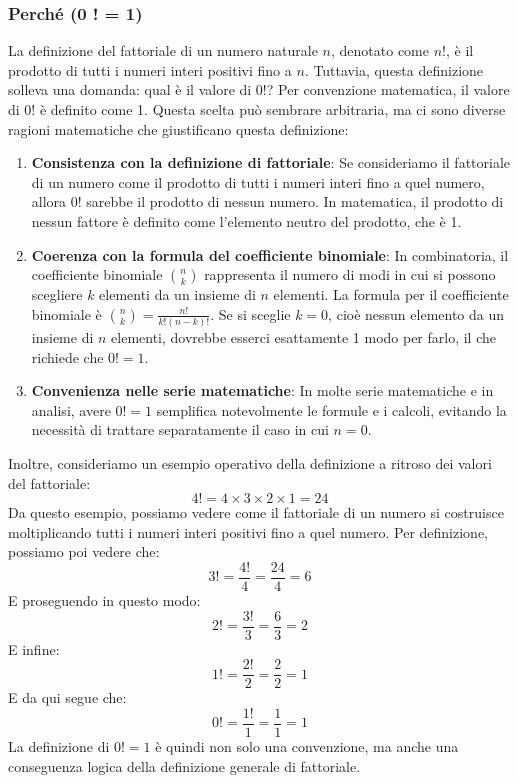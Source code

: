 \documentclass{book}
\begin{document}
\noindent\begin{minipage}{\textwidth}
    \begin{curiosity}
        \subsubsection{Perché (0 ! = 1)}
        La definizione del fattoriale di un numero naturale \( n \), denotato come \( n! \), è il prodotto di tutti i numeri interi positivi fino a \( n \). Tuttavia, questa definizione solleva una domanda: qual è il valore di \( 0! \)?
        Per convenzione matematica, il valore di \( 0! \) è definito come 1. Questa scelta può sembrare arbitraria, ma ci sono diverse ragioni matematiche che giustificano questa definizione:
        \begin{enumerate}
            \item \textbf{Consistenza con la definizione di fattoriale}: Se consideriamo il fattoriale di un numero come il prodotto di tutti i numeri interi fino a quel numero, allora \( 0! \) sarebbe il prodotto di nessun numero. In matematica, il prodotto di nessun fattore è definito come l'elemento neutro del prodotto, che è 1.
            \item \textbf{Coerenza con la formula del coefficiente binomiale}: In combinatoria, il coefficiente binomiale \( \binom{n}{k} \) rappresenta il numero di modi in cui si possono scegliere \( k \) elementi da un insieme di \( n \) elementi. La formula per il coefficiente binomiale è \( \binom{n}{k} = \frac{n!}{k!(n-k)!} \). Se si sceglie \( k = 0 \), cioè nessun elemento da un insieme di \( n \) elementi, dovrebbe esserci esattamente 1 modo per farlo, il che richiede che \( 0! = 1 \).
            \item \textbf{Convenienza nelle serie matematiche}: In molte serie matematiche e in analisi, avere \( 0! = 1 \) semplifica notevolmente le formule e i calcoli, evitando la necessità di trattare separatamente il caso in cui \( n = 0 \).
        \end{enumerate}
        Inoltre, consideriamo un esempio operativo della definizione a ritroso dei valori del fattoriale:
        \[4! = 4 \times 3 \times 2 \times 1 = 24\]
        Da questo esempio, possiamo vedere come il fattoriale di un numero si costruisce moltiplicando tutti i numeri interi positivi fino a quel numero. Per definizione, possiamo poi vedere che:
        \[3! = \frac{4!}{4} = \frac{24}{4} = 6\]
        E proseguendo in questo modo:
        \[2! = \frac{3!}{3} = \frac{6}{3} = 2\]
        E infine:
        \[1! = \frac{2!}{2} = \frac{2}{2} = 1\]
        E da qui segue che:
        \[0! = \frac{1!}{1} = \frac{1}{1} = 1\]
        La definizione di \(0! = 1\) è quindi non solo una convenzione, ma anche una conseguenza logica della definizione generale di fattoriale.
    \end{curiosity}
\end{minipage}
\end{document}
